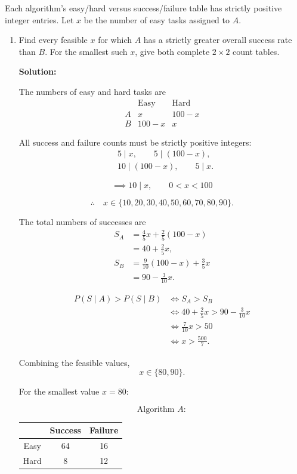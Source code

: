 \documentclass[11pt,a4paper]{article}
\begin{document}
Each algorithm's easy/hard versus success/failure table
has strictly positive integer entries. Let $x$ be the
number of easy tasks assigned to $A$.

\begin{enumerate}
\item Find every feasible $x$ for which $A$ has a strictly
greater overall success rate than $B$. For the smallest
such $x$, give both complete $2\times2$ count tables.

\textbf{Solution:}

The numbers of easy and hard tasks are
\[
\begin{array}{c|cc}
 & \text{Easy} & \text{Hard}\\
\hline
A & x & 100-x\\
B & 100-x & x
\end{array}
\]

All success and failure counts must be strictly
positive integers:
\[
\begin{aligned}
&5\mid x,\qquad 5\mid(100-x),\\
&10\mid(100-x),\qquad 5\mid x.
\end{aligned}
\]

\[
\implies 10\mid x,\qquad 0<x<100
\]

\[
\therefore\quad
x\in\{10,20,30,40,50,60,70,80,90\}.
\]

The total numbers of successes are
\[
\begin{aligned}
S_A
&=\frac45x+\frac25(100-x)\\
&=40+\frac25x,\\[6pt]
S_B
&=\frac9{10}(100-x)+\frac35x\\
&=90-\frac3{10}x.
\end{aligned}
\]

\[
\begin{aligned}
P(S\mid A)>P(S\mid B)
&\iff S_A>S_B\\
&\iff 40+\frac25x>90-\frac3{10}x\\
&\iff \frac7{10}x>50\\
&\iff x>\frac{500}{7}.
\end{aligned}
\]

Combining the feasible values,
\[
x\in\{80,90\}.
\]

For the smallest value $x=80$:

\[
\text{Algorithm }A:
\]

\begin{center}
\begin{tabular}{c|cc}
\toprule
 & Success & Failure\\
\midrule
Easy & 64 & 16\\
Hard & 8 & 12\\
\bottomrule
\end{tabular}
\end{center}


\end{enumerate}
\end{document}
